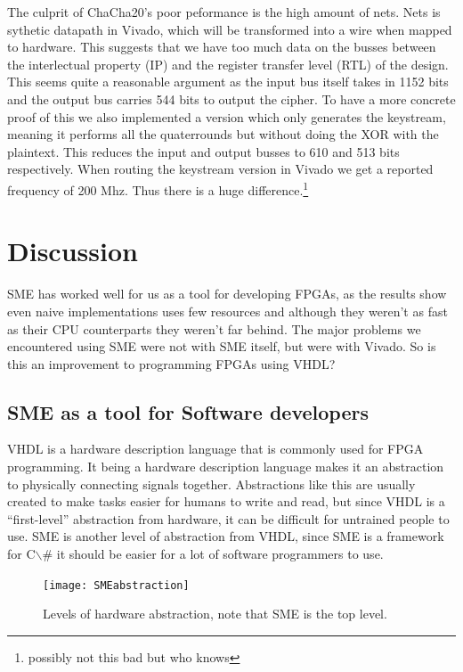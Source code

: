 \documentclass[a4paper, openany]{book}
\begin{document}
\begin{abstact}
The culprit of ChaCha20's poor peformance is the high amount of nets. Nets is sythetic datapath in Vivado, which will be transformed into a wire when mapped to hardware. This suggests that we have too much data on the busses between the interlectual property (IP) and the register transfer level (RTL) of the design. This seems quite a reasonable argument as the input bus itself takes in 1152 bits and the output bus carries 544 bits to output the cipher.
To have a more concrete proof of this we also implemented a version which only generates the keystream, meaning it performs all the quaterrounds but without doing the XOR with the plaintext. This reduces the input and output busses to 610 and 513 bits respectively. When routing the keystream version in Vivado we get a reported frequency of 200 Mhz. Thus there is a huge difference.\footnote{possibly not this bad but who knows}

\chapter{Discussion}
\label{sec:orge525f32}
SME has worked well for us as a tool for developing FPGAs, as the results show even naive implementations uses few resources
and although they weren't as fast as their CPU counterparts they weren't far behind. The major problems we encountered using SME were not with SME itself,
but were with Vivado. So is this an improvement to programming FPGAs using VHDL?

\section{SME as a tool for Software developers}
\label{sec:org5d976ca}
VHDL is a hardware description language that is commonly used for FPGA programming.
It being a hardware description language makes it an abstraction to physically connecting signals together.
Abstractions like this are usually created to make tasks easier for humans to write and read,
but since VHDL is a ``first-level'' abstraction from hardware, it can be difficult for untrained people to use.
SME is another level of abstraction from VHDL, since SME is a framework for C$\backslash$# it should be easier for a lot of software programmers to use.

\begin{figure}[H]
  \centering
  \texttt{[image: SMEabstraction]}
  \caption{Levels of hardware abstraction, note that SME is the top level.}
\end{figure}


\end{abstact}
\end{document}
